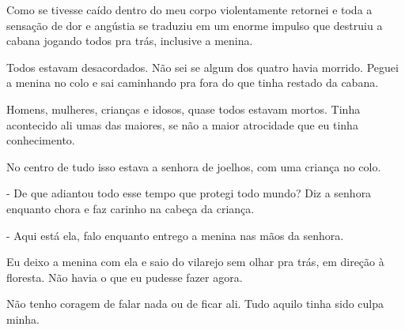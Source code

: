 Como se tivesse caído dentro do meu corpo violentamente retornei e toda a sensação de dor e angústia se traduziu em um enorme impulso que destruiu a cabana jogando todos pra trás, inclusive a menina.

Todos estavam desacordados. Não sei se algum dos quatro havia morrido. Peguei a menina no colo e sai caminhando pra fora do que tinha restado da cabana.

Homens, mulheres, crianças e idosos, quase todos estavam mortos. Tinha acontecido ali umas das maiores, se não a maior atrocidade que eu tinha conhecimento.

No centro de tudo isso estava a senhora de joelhos, com uma criança no colo.

- De que adiantou todo esse tempo que protegi todo mundo? Diz a senhora enquanto chora e faz carinho na cabeça da criança.

- Aqui está ela, falo enquanto entrego a menina nas mãos da senhora.

Eu deixo a menina com ela e saio do vilarejo sem olhar pra trás, em direção à floresta. Não havia o que eu pudesse fazer agora.

Não tenho coragem de falar nada ou de ficar ali. Tudo aquilo tinha sido culpa minha.




